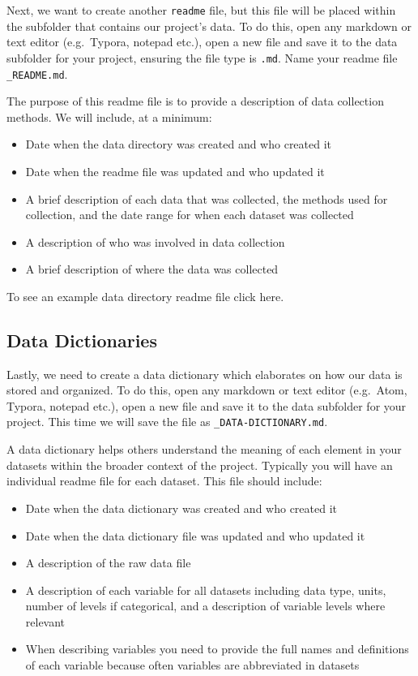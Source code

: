 \documentclass[
]{book}
\providecommand{\tightlist}{%
  \setlength{\itemsep}{0pt}\setlength{\parskip}{0pt}}
\begin{document}
Next, we want to create another \texttt{readme} file, but this file will be placed within the subfolder that contains our project's data. To do this, open any markdown or text editor (e.g.~Typora, notepad etc.), open a new file and save it to the data subfolder for your project, ensuring the file type is \texttt{.md}. Name your readme file \texttt{\_README.md}.

The purpose of this readme file is to provide a description of data collection methods. We will include, at a minimum:

\begin{itemize}
\tightlist
\item
  Date when the data directory was created and who created it
\item
  Date when the readme file was updated and who updated it
\item
  A brief description of each data that was collected, the methods used for collection, and the date range for when each dataset was collected
\item
  A description of who was involved in data collection
\item
  A brief description of where the data was collected
\end{itemize}

To see an example data directory readme file click here.

\hypertarget{data-dictionaries}{%
\subsection*{Data Dictionaries}\label{data-dictionaries}}

Lastly, we need to create a data dictionary which elaborates on how our data is stored and organized. To do this, open any markdown or text editor (e.g.~Atom, Typora, notepad etc.), open a new file and save it to the data subfolder for your project. This time we will save the file as \texttt{\_DATA-DICTIONARY.md}.

A data dictionary helps others understand the meaning of each element in your datasets within the broader context of the project. Typically you will have an individual readme file for each dataset. This file should include:

\begin{itemize}
\tightlist
\item
  Date when the data dictionary was created and who created it
\item
  Date when the data dictionary file was updated and who updated it
\item
  A description of the raw data file
\item
  A description of each variable for all datasets including data type, units, number of levels if categorical, and a description of variable levels where relevant
\item
  When describing variables you need to provide the full names and definitions of each variable because often variables are abbreviated in datasets
\end{itemize}
\end{document}
